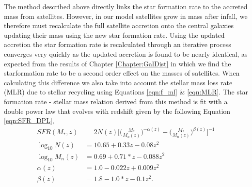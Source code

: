 The method described above directly links the star formation rate to the accreted mass from satellites. However, in our model satellites grow in mass after infall, we therefore must recalculate the full satellite accretion onto the central galaxies updating their mass using the new star formation rate. Using the updated accretion the star formation rate is recalculated through an iterative process converges very quickly as the updated accretion is found to be nearly identical, as expected from the results of Chapter \ref{Chapter:GalDist} in which we find the starformation rate to be a second order effect on the masses of satellites. When calculating this difference we also take into account the stellar mass loss rate (MLR) due to stellar recycling using Equations \ref{eqn:f_ml} \& \ref{eqn:MLR}. The star formation rate - stellar mass relation derived from this method is fit with a double power law that evolves with redshift given by the following Equation \ref{eqn:SFR_DPL},
\begin{equation}
\label{eqn:SFR_DPL}
\begin{split}
SFR(M_*, z) &= 2N(z)\Big[ \Big( \frac{M_*}{M_{n}(z)}\Big) ^{- \alpha(z)} + \Big( \frac{M_*}{M_{n}(z)}\Big)^{\beta(z)} \Big ]^{-1}\\
\log_{10} N(z) &= 10.65 + 0.33z - 0.08z^2\\
\log_{10} M_{n}(z) &= 0.69 + 0.71*z - 0.088z^2\\
\alpha(z) &= 1.0 - 0.022z + 0.009z^2\\
\beta(z) &= 1.8 - 1.0*z - 0.1z^2.
\end{split}
\end{equation}

